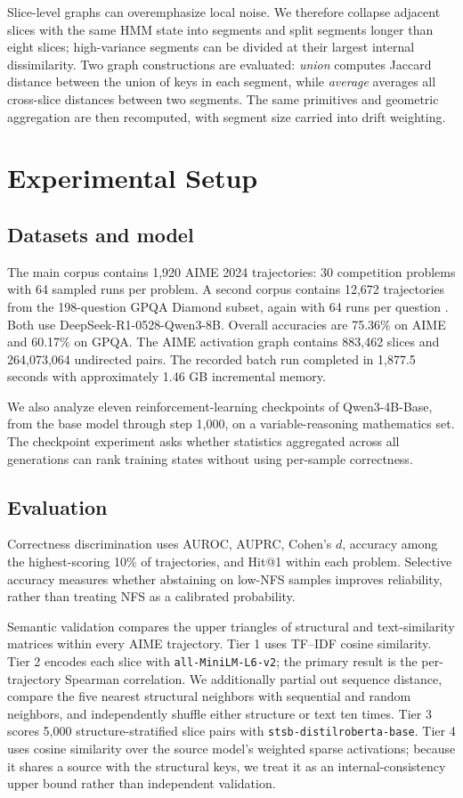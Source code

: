 \documentclass{article}
\newcommand{\nfs}{\textsc{NFS}}
\begin{document}
Slice-level graphs can overemphasize local noise. We therefore collapse adjacent slices with the same HMM state into segments and split segments longer than eight slices; high-variance segments can be divided at their largest internal dissimilarity. Two graph constructions are evaluated: \emph{union} computes Jaccard distance between the union of keys in each segment, while \emph{average} averages all cross-slice distances between two segments. The same primitives and geometric aggregation are then recomputed, with segment size carried into drift weighting.

\section{Experimental Setup}

\subsection{Datasets and model}

The main corpus contains 1,920 AIME 2024 trajectories: 30 competition problems with 64 sampled runs per problem. A second corpus contains 12,672 trajectories from the 198-question GPQA Diamond subset, again with 64 runs per question \citep{rein2024gpqa}. Both use DeepSeek-R1-0528-Qwen3-8B. Overall accuracies are 75.36\% on AIME and 60.17\% on GPQA. The AIME activation graph contains 883,462 slices and 264,073,064 undirected pairs. The recorded batch run completed in 1,877.5 seconds with approximately 1.46 GB incremental memory.

We also analyze eleven reinforcement-learning checkpoints of Qwen3-4B-Base, from the base model through step 1,000, on a variable-reasoning mathematics set. The checkpoint experiment asks whether statistics aggregated across all generations can rank training states without using per-sample correctness.

\subsection{Evaluation}

Correctness discrimination uses AUROC, AUPRC, Cohen's $d$, accuracy among the highest-scoring 10\% of trajectories, and Hit@1 within each problem. Selective accuracy measures whether abstaining on low-\nfs{} samples improves reliability, rather than treating \nfs{} as a calibrated probability.

Semantic validation compares the upper triangles of structural and text-similarity matrices within every AIME trajectory. Tier 1 uses TF--IDF cosine similarity. Tier 2 encodes each slice with \texttt{all-MiniLM-L6-v2}; the primary result is the per-trajectory Spearman correlation. We additionally partial out sequence distance, compare the five nearest structural neighbors with sequential and random neighbors, and independently shuffle either structure or text ten times. Tier 3 scores 5,000 structure-stratified slice pairs with \texttt{stsb-distilroberta-base}. Tier 4 uses cosine similarity over the source model's weighted sparse activations; because it shares a source with the structural keys, we treat it as an internal-consistency upper bound rather than independent validation.
\end{document}
